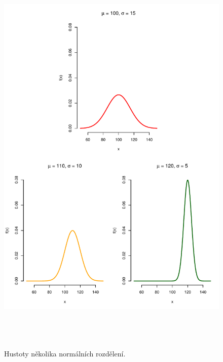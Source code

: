 \begin{figure}[p]\centering
\includegraphics[width=140mm, height=198mm]{../img/ukazka-obr03}
\caption{Hustoty několika normálních rozdělení.}
\label{obr03:Nhust:podruhe}

\end{figure}
